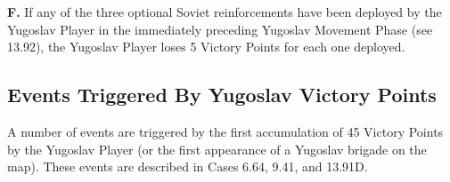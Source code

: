 \textbf{F.} If any of the three optional Soviet reinforcements have been deployed by the Yugoslav Player in the immediately preceding Yugoslav Movement Phase (see 13.92), the Yugoslav Player loses 5 Victory Points for each one deployed.

\subsection{Events Triggered By Yugoslav Victory Points}\label{sec:14.4}

A number of events are triggered by the first accumulation of 45 Victory Points by the Yugoslav Player (or the first appearance of a Yugoslav brigade on the map). These events are described in Cases 6.64, 9.41, and 13.91D.
